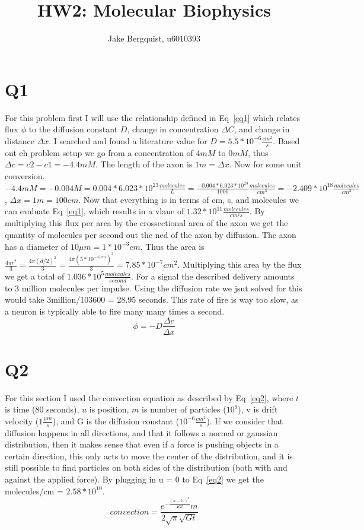 \documentclass[12pt]{article}
\begin{document}
	
	


\title{HW2: Molecular Biophysics}
\author{Jake Bergquist, u6010393 }
\maketitle

\section{Q1}
For this problem first I will use the relationship defined in Eq~\ref{eq1} which relates flux $\phi$ to the diffusion constant $D$, change in concentration $\Delta C$, and change in distance $\Delta x$. I searched and found a literature value for $D = 5.5*10^{-6}\frac{cm^2}{s}$. Based ont eh problem setup we go from a concentration of $4 mM$ to $0 mM$, thus $\Delta c = c2-c1 = -4.4mM$. The length of the axon is $1m = \Delta x$. Now for some unit conversion. $-4.4 mM = -0.004 M = 0.004 * 6.023*10^{23}\frac{molecules}{L} = \frac{-0.004 * 6.023*10^{23}}{1000}\frac{molecules}{cm^3} = -2.409 * 10^{18} \frac{molecules}{cm^3}$, $\Delta x = 1m = 100 cm$. Now that everything is in terms of cm, s, and molecules we can evaluate Eq~\ref{eq1}, which results in a vlaue of $1.32*10^{11}\frac{molecules}{cm^2s}$. By multiplying this flux per area by the crossectional area of the axon we get the quantity of molecules per second out the ned of the axon by diffusion. The axon has a diameter of $10\mu m = 1*10^{-3} cm$. Thus the area is $\frac{4\pi r^2}{3} = \frac{4\pi (d/2)^2}{3} =\frac{4\pi (5*10^{-4)cm})^2}{3} = 7.85*10^{-7} cm^2$. Multiplying this area by the flux we get a total of $1.036*10^5 \frac{molecules}{second}$.  For a signal the described delivery amounts to 3 million molecules per impulse. Using the diffusion rate we jsut solved for this would take 3million/103600 = 28.95 seconds. This rate of fire is way too slow, as a neuron is typically able to fire many many times a second.
\begin{equation}
\phi = -D \frac{\Delta c}{\Delta x}
\label{eq1}
\end{equation}
\section{Q2}
For this section I used the convection equation as described by Eq~\ref{eq2}, where $t$ is time (80 seconds), $u$ is position, $m$ is number of particles ($10^9$), v is drift velocity ($1\frac{\mu m}{s}$), and G is the diffusion constant ($10^{-6}\frac{cm^2}{s}$). If we consider that diffusion happens in all directions, and that it follows a normal or gaussian distribution, then it makes sense that even if a force is pushing objects in a certain direction, this only acts to move the center of the distribution, and it is still possible to find particles on both sides of the distribution (both with and against the applied force). By plugging in u = 0 to Eq~\ref{eq2} we get the molecules/cm = $2.58*10^{10}$.
\begin{equation}
convection = \frac{e^{-\frac{(u - tv)^2}{4Gt}}m}{2\sqrt{\pi}\sqrt{Gt}}
\label{eq2}
\end{equation}
\end{document}
